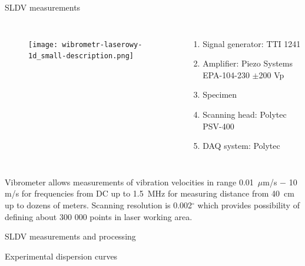 \documentclass[10pt]{beamer} %
\begin{document}
\begin{frame}[t,label=frame13]{SLDV measurements}
\begin{columns}[T]
	\begin{figure}
	\texttt{[image: wibrometr-laserowy-1d\_small-description.png]}
	\end{figure}
	\begin{enumerate}
	\item Signal generator: TTI 1241 
	\item Amplifier: Piezo Systems EPA-104-230 $\pm$200 Vp
	\item Specimen
	\item Scanning head: Polytec PSV-400
	\item DAQ system: Polytec
	\end{enumerate}
\end{columns}
{\small
 Vibrometer allows measurements of vibration velocities in range 0.01~$\mu$m/s $-$ 10 m/s for frequencies from DC up to 1.5~MHz for measuring distance from 40~cm up to dozens of meters. Scanning resolution is 0.002$^{\circ}$  which provides possibility of defining about 300 000 points in laser working area.}
\end{frame}
\begin{frame}[t,label=frame14]{SLDV measurements and processing}
\begin{figure}
\end{figure}
\end{frame}
\begin{frame}[t,label=frame15]{Experimental dispersion curves}
\begin{figure} [h!]
	\newcommand{\modelname}{ga_plain_weave_known_mass}
	\centering
		\label{fig:dispersion60deg_initial}
\end{figure}
\end{frame}
\end{document}
